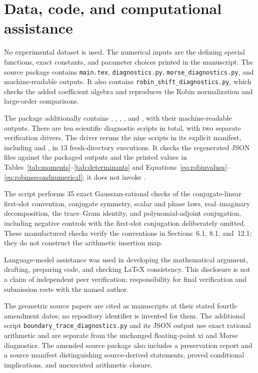 \documentclass[11pt,letterpaper]{article}
\numberwithin{equation}{section}
\theoremstyle{definition}
\theoremstyle{remark}
\begin{document}
\section*{Data, code, and computational assistance}
No experimental dataset is used. The numerical inputs are the defining special functions, exact constants, and parameter choices printed in the manuscript. The source package contains \texttt{main.tex}, \texttt{diagnostics.py}, \texttt{morse\_diagnostics.py}, and machine-readable outputs. It also contains \texttt{robin\_shift\_diagnostics.py}, which checks the added coefficient algebra and reproduces the Robin normalization and large-order comparisons. 

The package additionally contains , , , , and , with their machine-readable outputs. There are ten scientific diagnostic scripts in total, with two separate verification drivers. The driver  reruns the nine scripts in its explicit manifest, including  and , in 13 fresh-directory executions. It checks the regenerated JSON files against the packaged outputs and the printed values in Tables~\ref{tab:moments}--\ref{tab:determinants} and Equations~\eqref{eq:robinvalues}--\eqref{eq:robinsecondnumerical}; it does not invoke .

The script  performs 35 exact Gaussian-rational checks of the conjugate-linear first-slot convention, conjugate symmetry, scalar and phase laws, real--imaginary decomposition, the trace--Gram identity, and polynomial-adjoint conjugation, including negative controls with the first-slot conjugation deliberately omitted. These manufactured checks verify the conventions in Sections~6.1, 8.1, and~12.1; they do not construct the arithmetic insertion map.

Language-model assistance was used in developing the mathematical argument, drafting, preparing code, and checking LaTeX consistency. This disclosure is not a claim of independent peer verification; responsibility for final verification and submission rests with the named author.

The geometric source papers are cited as manuscripts at their stated fourth-amendment dates; no repository identifier is invented for them. The additional script \texttt{boundary\_trace\_diagnostics.py} and its JSON output use exact rational arithmetic and are separate from the unchanged floating-point xi and Morse diagnostics. The amended source package also includes a preservation report and a source manifest distinguishing source-derived statements, proved conditional implications, and unexecuted arithmetic closure.
\end{document}
